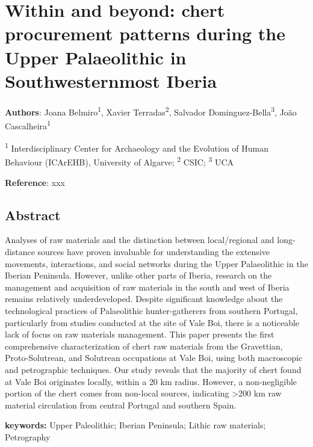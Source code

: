 \documentclass[
  a4paper,
  DIV=11,
  numbers=noendperiod]{scrreprt}
\begin{document}

\chapter{Within and beyond: chert procurement patterns during the Upper
Palaeolithic in Southwesternmost
Iberia}\label{within-and-beyond-chert-procurement-patterns-during-the-upper-palaeolithic-in-southwesternmost-iberia}

\textbf{Authors}: Joana Belmiro\textsuperscript{1}, Xavier
Terradas\textsuperscript{2}, Salvador
Dominguez-Bella\textsuperscript{3}, João Cascalheira\textsuperscript{1}

\pagebreak

\textsuperscript{1} Interdisciplinary Center for Archaeology and the
Evolution of Human Behaviour (ICArEHB), University of Algarve;
\textsuperscript{2} CSIC; \textsuperscript{3} UCA

\textbf{Reference}: xxx

\section*{Abstract}\label{abstract-2}


Analyses of raw materials and the distinction between local/regional and
long-distance sources have proven invaluable for understanding the
extensive movements, interactions, and social networks during the Upper
Palaeolithic in the Iberian Peninsula. However, unlike other parts of
Iberia, research on the management and acquisition of raw materials in
the south and west of Iberia remains relatively underdeveloped. Despite
significant knowledge about the technological practices of Palaeolithic
hunter-gatherers from southern Portugal, particularly from studies
conducted at the site of Vale Boi, there is a noticeable lack of focus
on raw materials management. This paper presents the first comprehensive
characterization of chert raw materials from the Gravettian,
Proto-Solutrean, and Solutrean occupations at Vale Boi, using both
macroscopic and petrographic techniques. Our study reveals that the
majority of chert found at Vale Boi originates locally, within a 20 km
radius. However, a non-negligible portion of the chert comes from
non-local sources, indicating \textgreater200 km raw material
circulation from central Portugal and southern Spain.

\textbf{keywords:} Upper Paleolithic; Iberian Peninsula; Lithic raw
materials; Petrography
\end{document}

